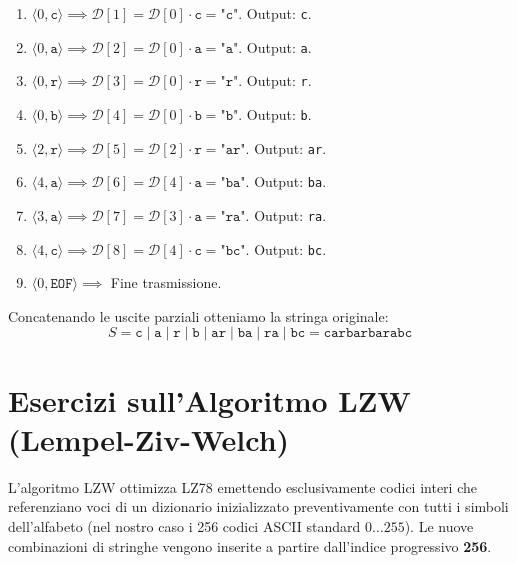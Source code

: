 \begin{enumerate}
  \item $\langle 0, \texttt{c} \rangle \implies \mathcal{D}[1] = \mathcal{D}[0] \cdot \texttt{c} = \texttt{"c"}$. Output: \texttt{c}.
  \item $\langle 0, \texttt{a} \rangle \implies \mathcal{D}[2] = \mathcal{D}[0] \cdot \texttt{a} = \texttt{"a"}$. Output: \texttt{a}.
  \item $\langle 0, \texttt{r} \rangle \implies \mathcal{D}[3] = \mathcal{D}[0] \cdot \texttt{r} = \texttt{"r"}$. Output: \texttt{r}.
  \item $\langle 0, \texttt{b} \rangle \implies \mathcal{D}[4] = \mathcal{D}[0] \cdot \texttt{b} = \texttt{"b"}$. Output: \texttt{b}.
  \item $\langle 2, \texttt{r} \rangle \implies \mathcal{D}[5] = \mathcal{D}[2] \cdot \texttt{r} = \texttt{"ar"}$. Output: \texttt{ar}.
  \item $\langle 4, \texttt{a} \rangle \implies \mathcal{D}[6] = \mathcal{D}[4] \cdot \texttt{a} = \texttt{"ba"}$. Output: \texttt{ba}.
  \item $\langle 3, \texttt{a} \rangle \implies \mathcal{D}[7] = \mathcal{D}[3] \cdot \texttt{a} = \texttt{"ra"}$. Output: \texttt{ra}.
  \item $\langle 4, \texttt{c} \rangle \implies \mathcal{D}[8] = \mathcal{D}[4] \cdot \texttt{c} = \texttt{"bc"}$. Output: \texttt{bc}.
  \item $\langle 0, \texttt{EOF} \rangle \implies$ Fine trasmissione.
\end{enumerate}

Concatenando le uscite parziali otteniamo la stringa originale:
\begin{equation}
  S = \texttt{c} \;|\; \texttt{a} \;|\; \texttt{r} \;|\; \texttt{b} \;|\; \texttt{ar} \;|\; \texttt{ba} \;|\; \texttt{ra} \;|\; \texttt{bc} = \texttt{carbarbarabc}
\end{equation}

\FloatBarrier
\section{Esercizi sull'Algoritmo LZW (Lempel-Ziv-Welch)}
\label{sec:esercizi-lzw}

L'algoritmo LZW \cite{welch1984} ottimizza LZ78 emettendo esclusivamente codici interi che referenziano voci di un dizionario inizializzato preventivamente con tutti i simboli dell'alfabeto (nel nostro caso i 256 codici ASCII standard $0 \dots 255$). Le nuove combinazioni di stringhe vengono inserite a partire dall'indice progressivo \textbf{256}.

